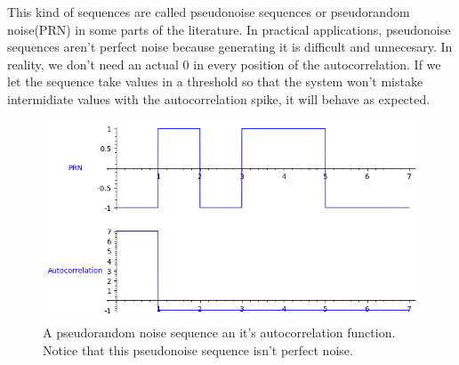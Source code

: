 This kind of sequences are called pseudonoise sequences or
pseudorandom noise(PRN) in some parts of the literature. In practical
applications, pseudonoise sequences aren't perfect noise because generating it
is difficult and unnecesary. In reality, we don't need an actual 0 in every
position of the autocorrelation. If we let the sequence take values in a
threshold so that the system won't mistake intermidiate values with the
autocorrelation spike, it will behave as expected.

\begin{figure}[ht!] %
\begin{center}
\includegraphics[width=0.7\linewidth]{Chapters/Introduction/signals_prn}
\end{center}
\caption{A pseudorandom noise sequence an it's autocorrelation function.
Notice that this pseudonoise sequence isn't perfect noise.}
\label{introduction_signals_autocorrelation}
\end{figure}


